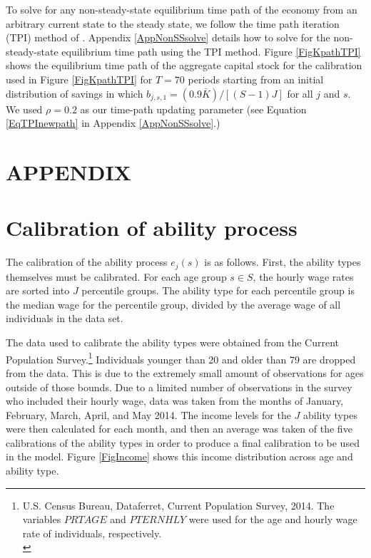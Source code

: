 \documentclass[letterpaper,12pt]{article}
\theoremstyle{definition}
\begin{document}
\begin{spacing}{1.5}
    To solve for any non-steady-state equilibrium time path of the economy from an arbitrary current state to the steady state, we follow the time path iteration (TPI) method of \citet{AuerbachKotlikoff:1987}. Appendix \ref{AppNonSSsolve} details how to solve for the non-steady-state equilibrium time path using the TPI method. Figure \ref{FigKpathTPI} shows the equilibrium time path of the aggregate capital stock for the calibration used in Figure \ref{FigKpathTPI} for $T=70$ periods starting from an initial distribution of savings in which $b_{j,s,1}=(0.9\bar{K})/[(S-1)J]$ for all $j$ and $s$. We used $\rho=0.2$ as our time-path updating parameter (see Equation \eqref{EqTPInewpath} in Appendix \ref{AppNonSSsolve}.)


\clearpage

\end{spacing}

\newpage
\renewcommand{\theequation}{A.\arabic{section}.\arabic{equation}}
\renewcommand{\thesection}{A-\arabic{section}}   %
\setcounter{equation}{0}                         %
\setcounter{section}{0}                          %
\section*{APPENDIX}                              %

\section{Calibration of ability process}\label{AppAbilCalib}

  The calibration of the ability process $e_j(s)$ is as follows.  First, the ability types themselves must be calibrated. For each age group $s \in S$, the hourly wage rates are sorted into $J$ percentile groups.  The ability type for each percentile group is the median wage for the percentile group, divided by the average wage of all individuals in the data set.

  The data used to calibrate the ability types were obtained from the Current Population Survey.\footnote{U.S. Census Bureau, Dataferret, Current Population Survey, 2014. The variables $PRTAGE$ and $PTERNHLY$ were used for the age and hourly wage rate of individuals, respectively. \\ [-2pt]} Individuals younger than 20 and older than 79 are dropped from the data. This is due to the extremely small amount of observations for ages outside of those bounds. Due to a limited number of observations in the survey who included their hourly wage, data was taken from the months of January, February, March, April, and May 2014.  The income levels for the $J$ ability types were then calculated for each month, and then an average was taken of the five calibrations of the ability types in order to produce a final calibration to be used in the model. Figure \ref{FigIncome} shows this income distribution across age and ability type.
\end{document}
